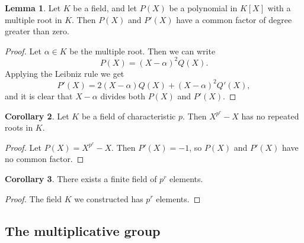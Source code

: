 \documentclass{article}
\newcommand{\rb}[1]{\left( #1 \right)}
\renewcommand{\sb}[1]{\left[ #1 \right]}
\theoremstyle{definition}\newtheorem{definition}{Definition}[subsection]
\theoremstyle{definition}\newtheorem{remark}[definition]{Remark}
\theoremstyle{definition}\newtheorem*{example}{Example}
\theoremstyle{definition}\newtheorem*{note}{Note}
\newtheorem{lemma}[definition]{Lemma}
\newtheorem{corollary}[definition]{Corollary}
\begin{document}
\begin{lemma}
Let $ K $ be a field, and let $ P\rb{X} $ be a polynomial in $ K\sb{X} $ with a multiple root in $ K $. Then $ P\rb{X} $ and $ P'\rb{X} $ have a common factor of degree greater than zero.
\end{lemma}

\begin{proof}
Let $ \alpha \in K $ be the multiple root. Then we can write
$$ P\rb{X} = \rb{X - \alpha}^2Q\rb{X}. $$
Applying the Leibniz rule we get
$$ P'\rb{X} = 2\rb{X - \alpha}Q\rb{X} + \rb{X - \alpha}^2Q'\rb{X}, $$
and it is clear that $ X - \alpha $ divides both $ P\rb{X} $ and $ P'\rb{X} $.
\end{proof}

\begin{corollary}
Let $ K $ be a field of characteristic $ p $. Then $ X^{p^r} - X $ has no repeated roots in $ K $.
\end{corollary}

\begin{proof}
Let $ P\rb{X} = X^{p^r} - X $. Then $ P'\rb{X} = -1 $, so $ P\rb{X} $ and $ P'\rb{X} $ have no common factor.
\end{proof}

\begin{corollary}
There exists a finite field of $ p^r $ elements.
\end{corollary}

\begin{proof}
The field $ K $ we constructed has $ p^r $ elements.
\end{proof}


\subsection{The multiplicative group}
\end{document}
